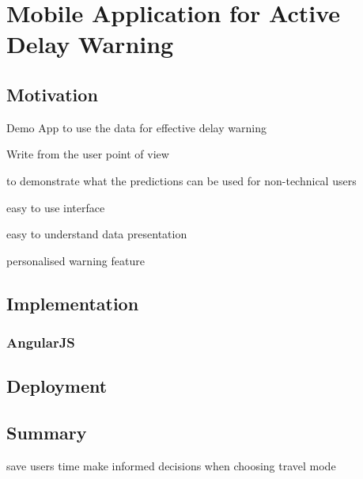 \chapter{Mobile Application for Active Delay Warning}
\label{ch:mobile_app}
\section{Motivation}
\par Demo App to use the data for effective delay warning

\par Write from the user point of view

\par to demonstrate what the predictions can be used for non-technical users

\par easy to use interface
\par easy to understand data presentation

\par personalised warning feature

\section{Implementation}
\subsection{AngularJS}

\section{Deployment}

\section{Summary}
save users time
make informed decisions when choosing travel mode

